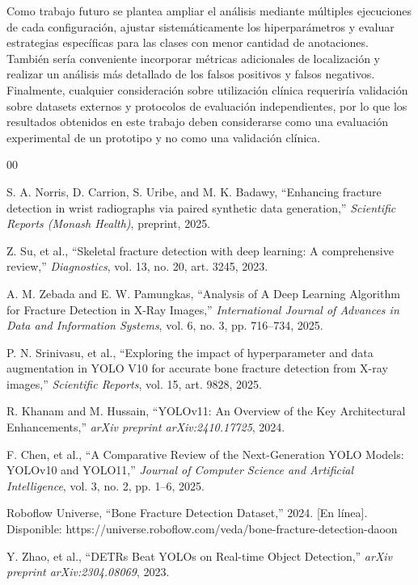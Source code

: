\documentclass[conference]{IEEEtran}
\begin{document}
Como trabajo futuro se plantea ampliar el análisis mediante múltiples ejecuciones de cada configuración, ajustar sistemáticamente los hiperparámetros y evaluar estrategias específicas para las clases con menor cantidad de anotaciones. También sería conveniente incorporar métricas adicionales de localización y realizar un análisis más detallado de los falsos positivos y falsos negativos. Finalmente, cualquier consideración sobre utilización clínica requeriría validación sobre datasets externos y protocolos de evaluación independientes, por lo que los resultados obtenidos en este trabajo deben considerarse como una evaluación experimental de un prototipo y no como una validación clínica.



\begin{thebibliography}{00}

S. A. Norris, D. Carrion, S. Uribe, and M. K. Badawy,
``Enhancing fracture detection in wrist radiographs via paired synthetic data generation,''
\textit{Scientific Reports (Monash Health)}, preprint, 2025.

Z. Su, et al.,
``Skeletal fracture detection with deep learning: A comprehensive review,''
\textit{Diagnostics}, vol. 13, no. 20, art. 3245, 2023.

A. M. Zebada and E. W. Pamungkas,
``Analysis of A Deep Learning Algorithm for Fracture Detection in X-Ray Images,''
\textit{International Journal of Advances in Data and Information Systems},
vol. 6, no. 3, pp. 716--734, 2025.

P. N. Srinivasu, et al.,
``Exploring the impact of hyperparameter and data augmentation in YOLO V10 for accurate bone fracture detection from X-ray images,''
\textit{Scientific Reports}, vol. 15, art. 9828, 2025.

R. Khanam and M. Hussain,
``YOLOv11: An Overview of the Key Architectural Enhancements,''
\textit{arXiv preprint arXiv:2410.17725}, 2024.

F. Chen, et al.,
``A Comparative Review of the Next-Generation YOLO Models: YOLOv10 and YOLO11,''
\textit{Journal of Computer Science and Artificial Intelligence},
vol. 3, no. 2, pp. 1--6, 2025.

Roboflow Universe,
``Bone Fracture Detection Dataset,''
2024. [En línea]. Disponible:
https://universe.roboflow.com/veda/bone-fracture-detection-daoon

Y. Zhao, et al.,
``DETRs Beat YOLOs on Real-time Object Detection,''
\textit{arXiv preprint arXiv:2304.08069}, 2023.

\end{thebibliography}
\end{document}
